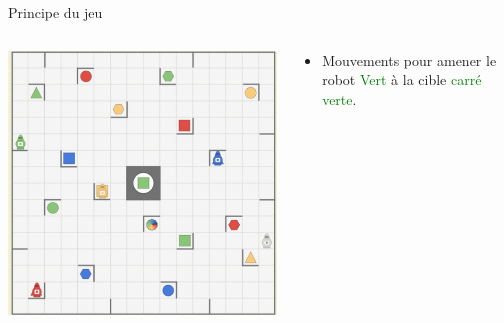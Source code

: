 \documentclass{beamer}
\begin{document}
\begin{frame}{Principe du jeu}
    \begin{columns}
        \begin{column}{0.6\textwidth}
        \vspace{\topsep}
        \includegraphics[scale=0.4]{Images/r2.png}%
        \end{column}
        
        \begin{column}{0.4\textwidth}
        \begin{itemize}
        \item Mouvements pour amener le robot \textcolor{green}{Vert} à la cible \textcolor{green}{carré verte}.
        \end{itemize}
        \end{column}
    \end{columns}
\end{frame}
\end{document}
